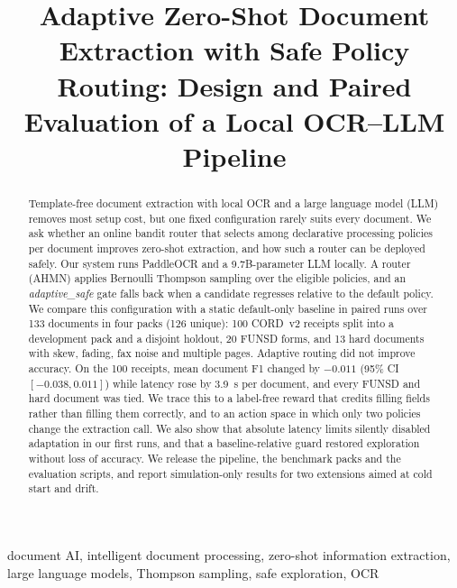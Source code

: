 \documentclass[conference,a4paper]{IEEEtran}
\begin{document}
\title{Adaptive Zero-Shot Document Extraction with Safe Policy Routing: Design and Paired Evaluation of a Local OCR--LLM Pipeline}

\author{}

\maketitle

\begin{abstract}
Template-free document extraction with local OCR and a large language model (LLM) removes most setup cost, but one fixed configuration rarely suits every document. We ask whether an online bandit router that selects among declarative processing policies per document improves zero-shot extraction, and how such a router can be deployed safely. Our system runs PaddleOCR and a 9.7B-parameter LLM locally. A router (AHMN) applies Bernoulli Thompson sampling over the eligible policies, and an \emph{adaptive\_safe} gate falls back when a candidate regresses relative to the default policy. We compare this configuration with a static default-only baseline in paired runs over 133 documents in four packs (126 unique): 100 CORD~v2 receipts split into a development pack and a disjoint holdout, 20 FUNSD forms, and 13 hard documents with skew, fading, fax noise and multiple pages. Adaptive routing did not improve accuracy. On the 100 receipts, mean document F1 changed by $-0.011$ (95\% CI $[-0.038, 0.011]$) while latency rose by 3.9~s per document, and every FUNSD and hard document was tied. We trace this to a label-free reward that credits filling fields rather than filling them correctly, and to an action space in which only two policies change the extraction call. We also show that absolute latency limits silently disabled adaptation in our first runs, and that a baseline-relative guard restored exploration without loss of accuracy. We release the pipeline, the benchmark packs and the evaluation scripts, and report simulation-only results for two extensions aimed at cold start and drift.
\end{abstract}

\begin{IEEEkeywords}
document AI, intelligent document processing, zero-shot information extraction, large language models, Thompson sampling, safe exploration, OCR
\end{IEEEkeywords}
\end{document}
